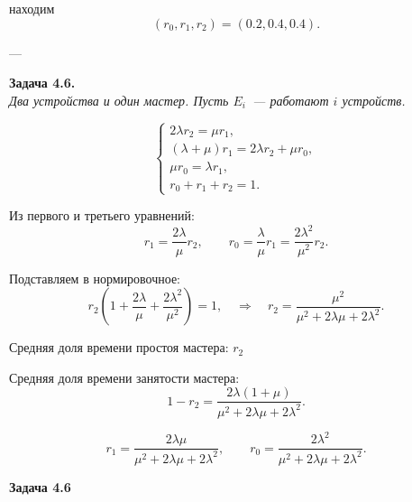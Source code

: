находим
\[
	(r_0, r_1, r_2) = (0.2, 0.4, 0.4).
\]

---

\textbf{Задача 4.6.} \\
\textit{Два устройства и один мастер. Пусть $E_i$~--- работают $i$ устройств.}

\vspace{1em}

\begin{center}
\end{center}

\vspace{1em}

\[
	\begin{cases}
		2\lambda r_2 = \mu r_1,                     \\[4pt]
		(\lambda+\mu) r_1 = 2\lambda r_2 + \mu r_0, \\[4pt]
		\mu r_0 = \lambda r_1,                      \\[4pt]
		r_0 + r_1 + r_2 = 1.
	\end{cases}
\]

Из первого и третьего уравнений:
\[
	r_1 = \dfrac{2\lambda}{\mu} r_2,
	\qquad
	r_0 = \dfrac{\lambda}{\mu} r_1 = \dfrac{2\lambda^2}{\mu^2} r_2.
\]

Подставляем в нормировочное:
\[
	r_2\!\left(1 + \dfrac{2\lambda}{\mu} + \dfrac{2\lambda^2}{\mu^2}\right) = 1,
	\quad\Rightarrow\quad
	r_2 = \dfrac{\mu^2}{\mu^2 + 2\lambda\mu + 2\lambda^2}.
\]

Средняя доля времени простоя мастера: $r_2$

Средняя доля времени занятости мастера:
\[
	1 - r_2 = \dfrac{2\lambda(1+\mu)}{\mu^2 + 2\lambda\mu + 2\lambda^2}.
\]

\[
	r_1 = \dfrac{2\lambda\mu}{\mu^2 + 2\lambda\mu + 2\lambda^2},
	\qquad
	r_0 = \dfrac{2\lambda^2}{\mu^2 + 2\lambda\mu + 2\lambda^2}.
\]


\textbf{Задача 4.6} \quad [$\lambda = 1$, $\mu = 2$]

